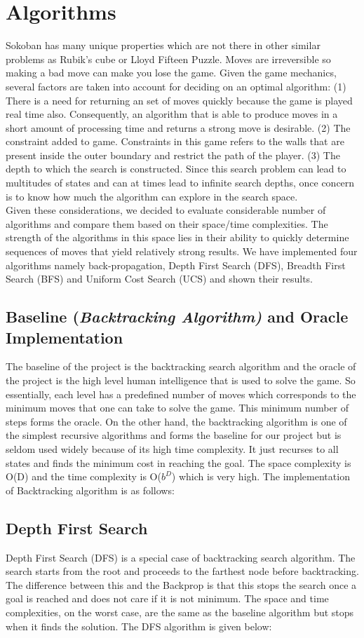 \documentclass[10pt, final]{article}
\newcommand{\br}[1][.75]{\ \\[#1\baselineskip]}
\begin{document}
\section{Algorithms}
Sokoban has many unique properties which are not there in other similar problems as Rubik’s cube or Lloyd Fifteen Puzzle. Moves are irreversible so making a bad move can make you lose the game. Given the game mechanics, several factors are taken into account for deciding on an optimal algorithm: 
(1) There is a need for returning an set of moves quickly because the game is played real time also. Consequently, an algorithm that is able to produce moves in a short amount of processing time and returns a strong move is desirable.
(2) The constraint added to game. Constraints in this game refers to the walls that are present inside the outer boundary and restrict the path of the player.  
(3) The depth to which the search is constructed. Since this search problem can lead to multitudes of states and can at times lead to infinite search depths, once concern is to know how much the algorithm can explore in the search space. \br
Given these considerations, we decided to evaluate considerable number of algorithms and compare them based on their space/time complexities. The strength of the algorithms in this space lies in their ability to quickly determine sequences of moves that yield relatively strong results. We have implemented four algorithms namely back-propagation, Depth First Search (DFS), Breadth First Search (BFS) and Uniform Cost Search (UCS) and shown their results. 
\subsection{Baseline (\textit{Backtracking Algorithm)} and Oracle Implementation}
The baseline of the project is the backtracking search algorithm and the oracle of the project is the high level human intelligence that is used to solve the game. So essentially, each level has a predefined number of moves which corresponds to the minimum moves that one can take to solve the game. This minimum number of steps forms the oracle. On the other hand, the backtracking algorithm is one of the simplest recursive algorithms and forms the baseline for our project but is seldom used widely because of its high time complexity. It just recurses to all states and finds the minimum cost in reaching the goal. The space complexity is O(D) and the time complexity is O($b^D$) which is very high. The implementation of Backtracking algorithm is as follows: 
\subsection{Depth First Search}
Depth First Search (DFS) is a special case of backtracking search algorithm. The search starts from the root and proceeds to the farthest node before backtracking. The difference between this and the Backprop is that this stops the search once a goal is reached and does not care if it is not minimum. The space and time complexities, on the worst case, are the same as the baseline algorithm but stops when it finds the solution. The DFS algorithm is given below:    
\end{document}
